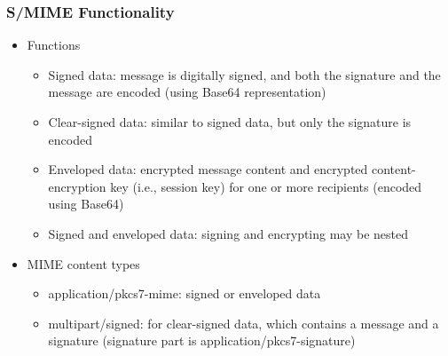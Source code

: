 \documentclass[final]{article}
\begin{document}
\subsubsection*{S/MIME Functionality}
\begin{itemize}[nosep]
    \item Functions
          \begin{itemize}[nosep]
              \item Signed data: message is digitally signed, and both the signature and the message are encoded (using Base64 representation)
              \item Clear-signed data: similar to signed data, but only the signature is encoded
              \item Enveloped data: encrypted message content and encrypted content-encryption key (i.e., session key) for one or more recipients (encoded using Base64)
              \item Signed and enveloped data: signing and encrypting may be nested
          \end{itemize}
    \item MIME content types
          \begin{itemize}[nosep]
              \item application/pkcs7-mime: signed or enveloped data
              \item multipart/signed: for clear-signed data, which contains a message and a signature (signature part is application/pkcs7-signature)
          \end{itemize}
\end{itemize}
\end{document}
